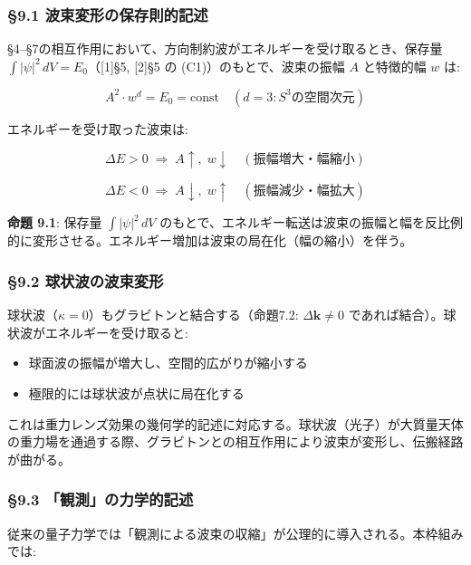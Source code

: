 \documentclass[
  a4paper,11pt]{ltjsarticle}
\providecommand{\tightlist}{%
  \setlength{\itemsep}{0pt}\setlength{\parskip}{0pt}}
\theoremstyle{definition}
\theoremstyle{remark}
\begin{document}
\subsubsection{§9.1
波束変形の保存則的記述}\label{ux6ce2ux675fux5909ux5f62ux306eux4fddux5b58ux5247ux7684ux8a18ux8ff0}

§4--§7の相互作用において、方向制約波がエネルギーを受け取るとき、保存量
\(\int |\psi|^2 \, dV = E_0\)（{[}1{]}§5, {[}2{]}§5 の
(C1)）のもとで、波束の振幅 \(A\) と特徴的幅 \(w\) は:

\[A^2 \cdot w^d = E_0 = \text{const} \quad (d = 3: S^3 \text{の空間次元})\]

エネルギーを受け取った波束は:

\[\Delta E > 0 \;\Rightarrow\; A \uparrow,\; w \downarrow \quad (\text{振幅増大・幅縮小})\]

\[\Delta E < 0 \;\Rightarrow\; A \downarrow,\; w \uparrow \quad (\text{振幅減少・幅拡大})\]

\textbf{命題 9.1}: 保存量 \(\int |\psi|^2 \, dV\)
のもとで、エネルギー転送は波束の振幅と幅を反比例的に変形させる。エネルギー増加は波束の局在化（幅の縮小）を伴う。

\subsubsection{§9.2
球状波の波束変形}\label{ux7403ux72b6ux6ce2ux306eux6ce2ux675fux5909ux5f62}

球状波（\(\kappa = 0\)）もグラビトンと結合する（命題7.2:
\(\Delta\mathbf{k} \neq 0\)
であれば結合）。球状波がエネルギーを受け取ると:

\begin{itemize}
\tightlist
\item
  球面波の振幅が増大し、空間的広がりが縮小する
\item
  極限的には球状波が点状に局在化する
\end{itemize}

これは重力レンズ効果の幾何学的記述に対応する。球状波（光子）が大質量天体の重力場を通過する際、グラビトンとの相互作用により波束が変形し、伝搬経路が曲がる。

\subsubsection{§9.3
「観測」の力学的記述}\label{ux89b3ux6e2cux306eux529bux5b66ux7684ux8a18ux8ff0}

従来の量子力学では「観測による波束の収縮」が公理的に導入される。本枠組みでは:
\end{document}
